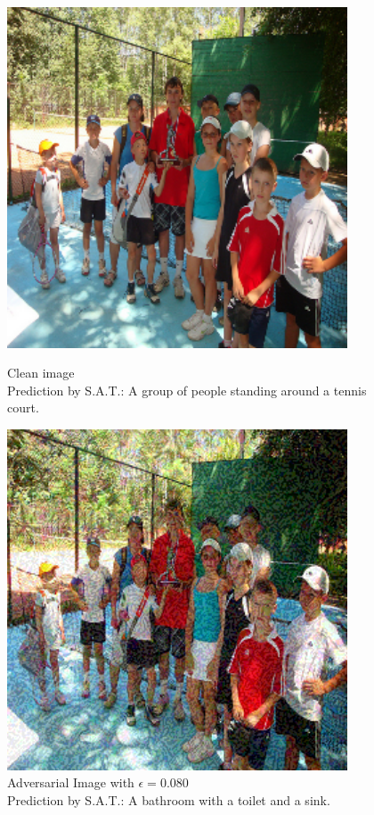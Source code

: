 \begin{figure}[ht]
    \centering
    \begin{minipage}{0.45\textwidth}
        \centering
        \includegraphics[width=0.9\textwidth]{figures/fast_method_group_of_people/group_of_people_0.000.png} %
        \caption*{Clean image\\Prediction by S.A.T.: A group of people standing around a tennis court.}
    \end{minipage}\hfill
    \begin{minipage}{0.45\textwidth}
        \centering
        \includegraphics[width=0.9\textwidth]{figures/fast_method_group_of_people/group_of_people_0.080.png} %
        \caption*{Adversarial Image with $\epsilon=0.080$\\Prediction by S.A.T.:  A bathroom with a toilet and a sink.}
    \end{minipage}
\end{figure}

